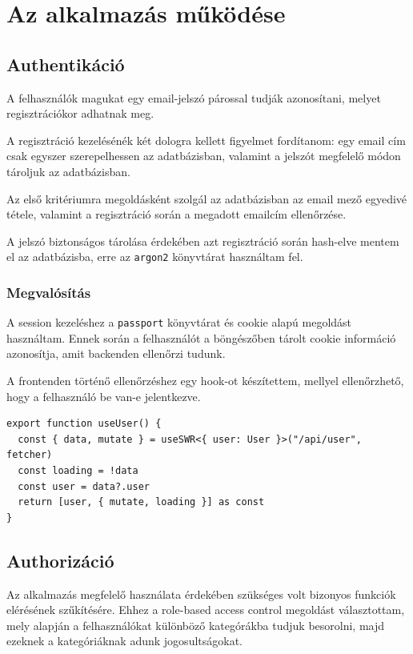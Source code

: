 \chapter{Az alkalmazás működése}

\section{Authentikáció}

A felhasználók magukat egy email-jelszó párossal tudják azonosítani, melyet regisztrációkor adhatnak meg.

A regisztráció kezelésénék két dologra kellett figyelmet fordítanom: egy email cím csak egyszer szerepelhessen
az adatbázisban, valamint a jelszót megfelelő módon tároljuk az adatbázisban.

Az első kritériumra megoldásként szolgál az adatbázisban az email mező egyedivé tétele, valamint a regisztráció során
a megadott emailcím ellenőrzése.

A jelszó biztonságos tárolása érdekében azt regisztráció során hash-elve mentem el az adatbázisba, erre az \lstinline|argon2| könyvtárat
használtam fel.

\subsection{Megvalósítás}

A session kezeléshez a \lstinline|passport| könyvtárat és cookie alapú megoldást használtam. Ennek során a felhasználót a böngészőben
tárolt cookie információ azonosítja, amit backenden ellenőrzi tudunk.

A frontenden történő ellenőrzéshez egy hook-ot készítettem, mellyel ellenőrzhető, hogy a felhasználó be van-e jelentkezve.

\begin{lstlisting}[caption=Authentikáció hook]
export function useUser() {
  const { data, mutate } = useSWR<{ user: User }>("/api/user", fetcher)
  const loading = !data
  const user = data?.user
  return [user, { mutate, loading }] as const
}
\end{lstlisting}

\section{Authorizáció}

Az alkalmazás megfelelő használata érdekében szükséges volt bizonyos funkciók elérésének szűkítésére. Ehhez a role-based access control
megoldást választottam, mely alapján a felhasználókat különböző kategórákba tudjuk besorolni, majd ezeknek a kategóriáknak adunk jogosultságokat.

